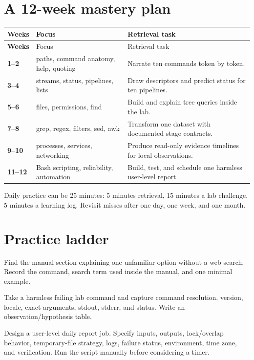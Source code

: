 \documentclass[11pt,oneside,openany]{book}
\begin{document}
\section{A 12-week mastery plan}
\begin{longtable}{>{\bfseries}p{}p{}p{}}
\toprule
Weeks & Focus & Retrieval task \\
\midrule
\endfirsthead\toprule Weeks & Focus & Retrieval task \\
\midrule\endhead
1--2 & paths, command anatomy, help, quoting & Narrate ten commands token by token. \\
3--4 & streams, status, pipelines, lists & Draw descriptors and predict status for ten pipelines. \\
5--6 & files, permissions, find & Build and explain tree queries inside the lab. \\
7--8 & grep, regex, filters, sed, awk & Transform one dataset with documented stage contracts. \\
9--10 & processes, services, networking & Produce read-only evidence timelines for local observations. \\
11--12 & Bash scripting, reliability, automation & Build, test, and schedule one harmless user-level report. \\
\bottomrule
\end{longtable}
Daily practice can be 25 minutes: 5 minutes retrieval, 15 minutes a lab challenge, 5 minutes a learning log. Revisit misses after one day, one week, and one month.

\section{Practice ladder}
\begin{practicebox}[title={Easy -- documentation retrieval}]
Find the manual section explaining one unfamiliar option without a web search. Record the command, search term used inside the manual, and one minimal example.
\end{practicebox}
\begin{practicebox}[title={Medium -- reproducible failure capsule}]
Take a harmless failing lab command and capture command resolution, version, locale, exact arguments, stdout, stderr, and status. Write an observation/hypothesis table.
\end{practicebox}
\begin{practicebox}[title={Hard -- idempotent automation design}]
Design a user-level daily report job. Specify inputs, outputs, lock/overlap behavior, temporary-file strategy, logs, failure status, environment, time zone, and verification. Run the script manually before considering a timer.
\end{practicebox}
\end{document}
